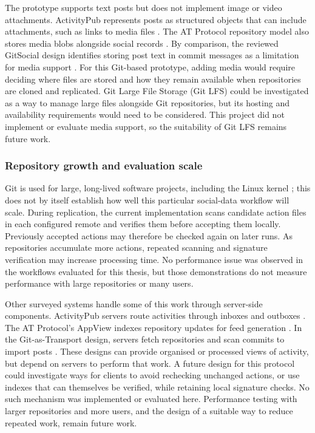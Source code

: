 The prototype supports text posts but does not implement image or video
attachments. ActivityPub represents posts as structured objects that can
include attachments, such as links to media files \cite{w3cActivityPub2018}.
The AT Protocol repository model also stores media blobs alongside social
records \cite{atproto2026}. By comparison, the reviewed GitSocial design
identifies storing post text in commit messages as a limitation for media
support \cite{gitsocial2026}. For this Git-based prototype, adding media would
require deciding where files are stored and how they remain available when
repositories are cloned and replicated. Git Large File Storage (Git LFS)
could be investigated as a way to manage large files alongside Git
repositories, but its hosting and availability requirements would need to
be considered.
This project did not implement or evaluate media support, so the suitability
of Git LFS remains future work.

\subsubsection{Repository growth and evaluation scale}\label{sec:limitation-repository-growth}

Git is used for large, long-lived software projects, including the Linux
kernel \cite{zhou2017scalability}; this does not by itself establish how
well this particular social-data workflow will scale. During replication,
the current implementation scans candidate action files in each configured
remote and verifies them before accepting them locally. Previously accepted
actions may therefore be checked again on later runs. As repositories
accumulate more actions, repeated scanning and signature verification may
increase processing time. No performance issue was observed in the
workflows evaluated for this thesis, but those demonstrations do not
measure performance with large repositories or many users.

Other surveyed systems handle some of this work through server-side
components. ActivityPub servers route activities through inboxes and
outboxes \cite{w3cActivityPub2018}. The AT Protocol's AppView indexes
repository updates for feed generation \cite{atproto2026}. In the
Git-as-Transport design, servers fetch repositories and scan commits to
import posts \cite{gittransport2026}. These designs can provide organised
or processed views of activity, but depend on servers to perform that work. A future
design for this protocol could investigate ways for clients to avoid
rechecking unchanged actions, or use indexes that can themselves be
verified, while retaining local signature checks. No such mechanism was
implemented or evaluated here. Performance testing with larger repositories
and more users, and the design of a suitable way to reduce repeated work,
remain future work.

